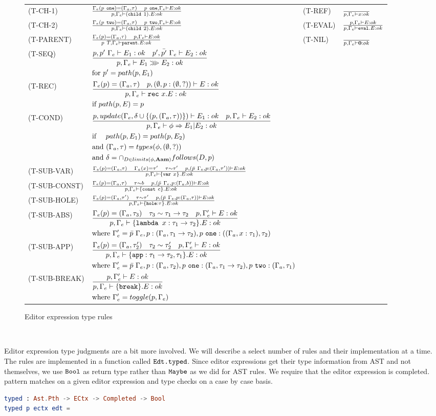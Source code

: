 \begin{figure*}
  \center
  \renewcommand{\arraystretch}{2}
  \begin{tabular}{llll}
    \scriptsize(T-CH-1)      & $ \TChOne $             & \scriptsize(T-REF)       & $ \TRef$                \\
    \scriptsize(T-CH-2)       & $ \TChTwo$               & \scriptsize(T-EVAL)      & $\TEval$               \\
    \scriptsize(T-PARENT)      & $ \TParent$             & \scriptsize(T-NIL)    & $\TNil$              \\
    \scriptsize(T-SEQ)       & \scriptsize$\TSeq$ & &\\
    \scriptsize(T-REC)       & \scriptsize$\TRec$   & &   \\
    \scriptsize(T-COND)      & \scriptsize$ \TCond$  & &\\
    \scriptsize(T-SUB-VAR)   & $ \TSubVar$            &           & \\
    \scriptsize(T-SUB-CONST) & $ \TSubConst$      & &\\
    \scriptsize(T-SUB-HOLE)  & $\TSubHole$ & &           \\
    \scriptsize(T-SUB-ABS)   & \scriptsize$\TSubAbs$   & & \\
    \scriptsize(T-SUB-APP)   & \scriptsize$ \TSubApp$ & & \\
    \scriptsize(T-SUB-BREAK) & \scriptsize$\TSubBreak$ & &
  \end{tabular}
  \caption{Editor expression type rules}
  \label{fig:edttyperules}
\end{figure*}
~

Editor expression type judgments are a bit more involved. We will describe a
select number of rules and their implementation at a time. The rules are
implemented in a function called $\elm{Edt.typed}$. Since editor expressions
get their type information from AST and not themselves, we use $\elm{Bool}$ as
return type rather than $\elm{Maybe}$ as we did for AST rules. We require that
the editor expression is completed.  pattern matches on a given
editor expression and type checks on a case by case basis.
\begin{lstlisting}[language=elm,%
    gobble=0,%
    ]
typed : Ast.Pth -> ECtx -> Completed -> Bool
typed p ectx edt =
\end{lstlisting}

